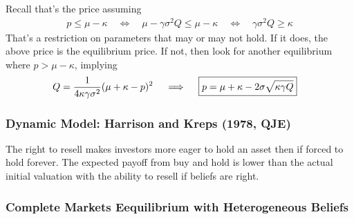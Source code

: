 \documentclass[12pt]{article}
\theoremstyle{plain}
\theoremstyle{definition}
\theoremstyle{remark}
\begin{document}
Recall that's the price assuming
\begin{align*}
  p \leq \mu-\kappa
  \quad\iff\quad
  \mu -\gamma\sigma^2 Q
  \leq \mu-\kappa
  \quad\iff\quad
  \gamma\sigma^2 Q
  \geq \kappa
\end{align*}
That's a restriction on parameters that may or may not hold. If it does,
the above price is the equilibrium price.
If not, then look for another equilibrium where $p>\mu-\kappa$, implying
\begin{align*}
  Q
  &=
  \frac{1}{4\kappa\gamma\sigma^2}
  (\mu+\kappa-p)^2
  \quad\implies\quad
  \boxed{%
    p = \mu+\kappa- 2\sigma\sqrt{\kappa\gamma Q}
  }
\end{align*}







\clearpage
\subsubsection{Dynamic Model: Harrison and Kreps (1978, QJE)}

The right to resell makes investors more eager to hold an asset then if
forced to hold forever.
The expected payoff from buy and hold is lower than the actual initial
valuation with the ability to resell if beliefs are right.





\subsubsection{Complete Markets Eequilibrium with Heterogeneous Beliefs}
\end{document}
